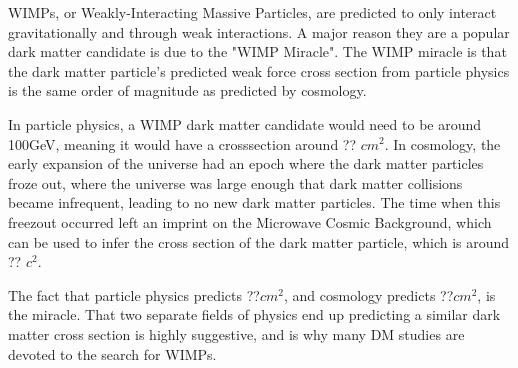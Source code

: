 WIMPs, or Weakly-Interacting Massive Particles, are predicted to only interact gravitationally and through weak interactions.
A major reason they are a popular dark matter candidate is due to the "WIMP Miracle".
The WIMP miracle is that the dark matter particle's predicted weak force cross section from particle physics is the same order of magnitude as predicted by cosmology.

In particle physics, a WIMP dark matter candidate would need to be around 100GeV, meaning it would have a crosssection around ?? $cm^{2}$.
In cosmology, the early expansion of the universe had an epoch where the dark matter particles froze out, where the universe was large enough that dark matter collisions became infrequent, leading to no new dark matter particles.
The time when this freezout occurred left an imprint on the Microwave Cosmic Background, which can be used to infer the cross section of the dark matter particle, which is around ?? $c^{2}$.

The fact that particle physics predicts ??$cm^{2}$, and cosmology predicts ??$cm^{2}$, is the miracle.
That two separate fields of physics end up predicting a similar dark matter cross section is highly suggestive, and is why many DM studies are devoted to the search for WIMPs.


